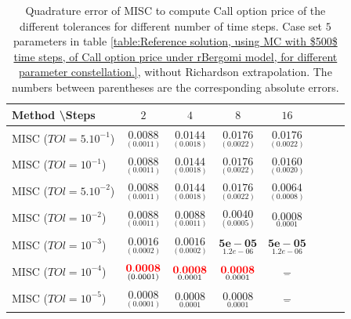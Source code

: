 \documentclass[11pt]{article}
\begin{document}
\begin{table}[h!]
	\centering
	\begin{tabular}{l*{6}{c}r}
		Method \textbackslash  Steps            & $2$ & $4$ & $8$ & $16$  \\
		\hline
		MISC ($TOl=5.10^{-1}$)  & $\underset{(   0.0011)}{\mathbf{  0.0088}}$ & $\underset{(
			0.0018)}{\mathbf{ 0.0144}}$ & $\underset{( 0.0022)}{\mathbf{0.0176}}$ & $\underset{(  0.0022)}{\mathbf{ 0.0176}}$  \\
		MISC ($TOl=10^{-1}$)  & $\underset{(   0.0011)}{\mathbf{  0.0088}}$ & $\underset{(
			0.0018)}{\mathbf{ 0.0144}}$& $\underset{( 0.0022)}{\mathbf{0.0176}}$  & $\underset{(  0.0020)}{\mathbf{ 0.0160}}$   \\
		MISC ($TOl=5.10^{-2}$)  &$\underset{(   0.0011)}{\mathbf{  0.0088}}$ & $\underset{(
			0.0018)}{\mathbf{ 0.0144}}$ & $\underset{( 0.0022)}{\mathbf{0.0176}}$  & $\underset{(0.0008)}{\mathbf{0.0064}}$  \\
		MISC ($TOl=10^{-2}$)  & $\underset{(   0.0011)}{\mathbf{  0.0088}}$ & $\underset{(0.0011
			)}{\mathbf{ 0.0088
		}}$ & $\underset{(0.0005)}{\mathbf{ 0.0040
		}}$ & $\underset{0.0001}{\mathbf{0.0008}}$  \\
		MISC ($TOl=10^{-3}$)  & $\underset{( 0.0002)}{\mathbf{    0.0016}}$ & $\underset{(0.0002
			)}{\mathbf{ 0.0016
		}}$ & $\underset{1.2e-06}{\mathbf{5e-05}}$ & $\underset{1.2e-06}{\mathbf{5e-05}}$  \\
		MISC ($TOl=10^{-4}$)  & $\underset{( 0.0001)}{\mathbf{    {\color{red}0.0008}}}$ & $\underset{0.0001}{\mathbf{{\color{red}0.0008}}}$& $\underset{0.0001}{\mathbf{{\color{red}0.0008}}}$ & $\underset{-}{\mathbf{-}}$  \\
		
			MISC ($TOl=10^{-5}$)  & $\underset{( 0.0001)}{\mathbf{    0.0008}}$ & $\underset{0.0001}{\mathbf{0.0008}}$& $\underset{0.0001}{\mathbf{0.0008}}$ & $\underset{-}{\mathbf{-}}$  \\
		
		\hline
		
	\end{tabular}
	\caption{Quadrature error of MISC to compute Call option price of the different tolerances for different number of time steps. Case  set $5$ parameters in table \ref{table:Reference solution, using MC with $500$ time steps, of Call option price under rBergomi model, for different parameter constellation.}, without Richardson extrapolation. The numbers between parentheses are the corresponding absolute errors.}
	\label{Quadrature error of MISC to compute Call option price of the different tolerances for different number of time steps. Case  set $5$ parameters, without Richardson extrapolation. The numbers between parentheses are the corresponding absolute errors.}
\end{table}
\end{document}
